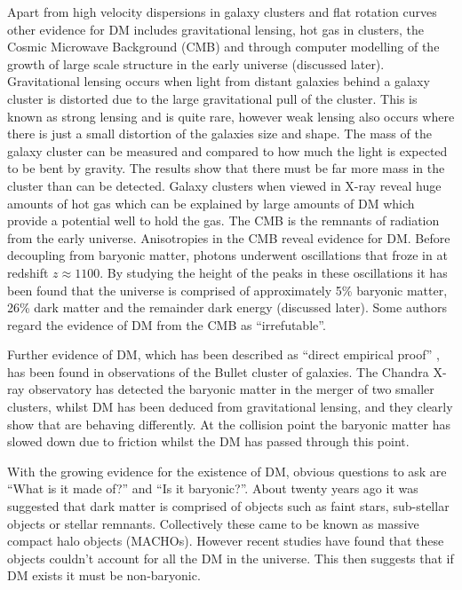 \documentclass[a4paper,12pt]{article}
\begin{document}
Apart from high velocity dispersions in galaxy clusters and flat rotation curves other evidence for DM includes gravitational lensing, hot gas in clusters, the Cosmic Microwave Background (CMB)
 and through computer modelling of the growth of 
large scale structure in the early universe (discussed later). Gravitational lensing occurs when light from distant galaxies behind a galaxy cluster is distorted due to the 
large gravitational pull of the cluster. This is known as strong lensing and is quite rare, however weak lensing also occurs where there is just a small distortion of the galaxies size
and shape. 
The mass of the galaxy cluster can be measured and compared to how much the light is expected to be bent by gravity. The results show that there must be far more mass in the cluster 
than can be detected. Galaxy clusters when viewed in X-ray reveal huge amounts of hot gas which can be explained by large amounts of DM which provide a potential well to hold the gas.
The CMB is the remnants of radiation from the early universe. Anisotropies in the CMB reveal evidence for DM. Before decoupling from baryonic matter, photons underwent oscillations that froze in
at redshift $z\approx1100$. By studying the height of the peaks in these oscillations it has been found that the universe is comprised of approximately 5\% baryonic matter, 26\% dark matter
and the remainder dark energy (discussed later). Some authors \citep{freese} regard the evidence of DM from the CMB as ``irrefutable''.

Further evidence of DM, which has been described as ``direct empirical proof'' \citep{clowe}, has been found in observations of the Bullet cluster of galaxies. The Chandra X-ray observatory 
has detected the baryonic matter in the merger of two smaller clusters, whilst DM has been deduced from gravitational lensing, and they clearly show that are behaving differently.
At the collision point the baryonic matter has slowed down due to friction whilst the DM has passed through this point.

With the growing evidence for the existence of DM, obvious questions to ask are ``What is it made of?'' and ``Is it baryonic?''. About twenty years ago it was suggested that dark matter is
comprised of objects such as faint stars, sub-stellar objects or stellar remnants. Collectively these came to be known as massive compact halo objects (MACHOs). However recent studies 
\citep{freese} have found that these objects couldn't account for all the DM in the universe. This then suggests that if DM exists it must be non-baryonic.
\end{document}
